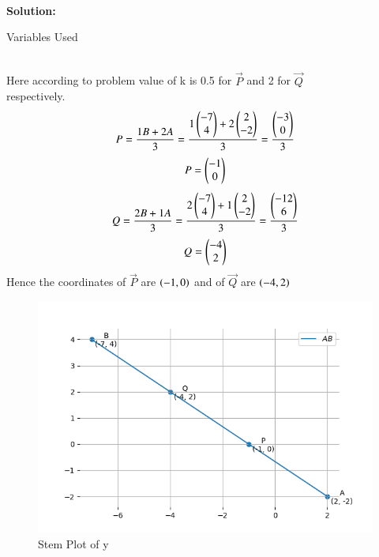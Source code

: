 \documentclass[journal]{IEEEtran}
\begin{document}
\hfill{}\\
\textbf{Solution: }
\begin{table}[h!]    
  \centering
  
  \caption{Variables Used}
  \label{tab10.5.3.9.1}
\end{table}\\
Here according to problem value of k is 0.5 for $\vec{P}$ and 2 for $\vec{Q}$\\ respectively.
\begin{align}
P=\frac{1B+2A}{3}=\frac{1\begin{pmatrix}-7\\4\end{pmatrix}+2\begin{pmatrix}2\\-2\end{pmatrix}}{3}=\frac{\begin{pmatrix}-3\\0\end{pmatrix}}{3}\\
\end{align}
\begin{align}
P=\begin{pmatrix}-1\\0\end{pmatrix}
\end{align}
\begin{align}
Q=\frac{2B+1A}{3}=\frac{2\begin{pmatrix}-7\\4\end{pmatrix}+1\begin{pmatrix}2\\-2\end{pmatrix}}{3}=\frac{\begin{pmatrix}-12\\6\end{pmatrix}}{3}\\
\end{align}
\begin{align}
Q=\begin{pmatrix}-4\\2\end{pmatrix}
\end{align}
Hence the coordinates of $\vec{P}$ are $\left(-1,0\right)$ and of $\vec{Q}$ are $\left(-4,2\right)$
\begin{figure}[h!]
   \centering
   \includegraphics[width=0.7\linewidth]{figs/Fig2.png}
   \caption{Stem Plot of y}
   \label{stemplot}
\end{figure}
\end{document}
